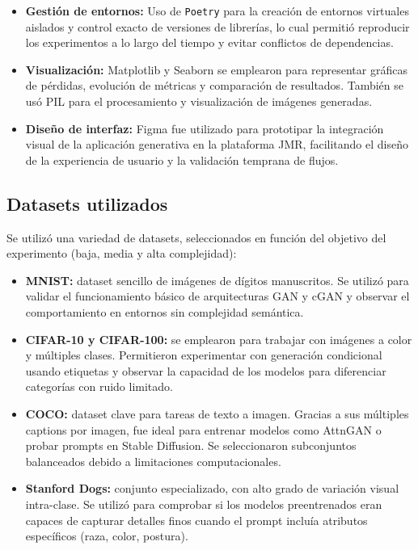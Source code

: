 \begin{itemize}
\item \textbf{Gestión de entornos:} Uso de \texttt{Poetry} para la creación de entornos virtuales aislados y control exacto de versiones de librerías, lo cual permitió reproducir los experimentos a lo largo del tiempo y evitar conflictos de dependencias.

\item \textbf{Visualización:} Matplotlib y Seaborn se emplearon para representar gráficas de pérdidas, evolución de métricas y comparación de resultados. También se usó PIL para el procesamiento y visualización de imágenes generadas.

\item \textbf{Diseño de interfaz:} Figma fue utilizado para prototipar la integración visual de la aplicación generativa en la plataforma JMR, facilitando el diseño de la experiencia de usuario y la validación temprana de flujos.


\end{itemize}

\subsection{Datasets utilizados}

Se utilizó una variedad de datasets, seleccionados en función del objetivo del experimento (baja, media y alta complejidad):

\begin{itemize}
\item \textbf{MNIST:} dataset sencillo de imágenes de dígitos manuscritos. Se utilizó para validar el funcionamiento básico de arquitecturas GAN y cGAN y observar el comportamiento en entornos sin complejidad semántica.


\item \textbf{CIFAR-10 y CIFAR-100:} se emplearon para trabajar con imágenes a color y múltiples clases. Permitieron experimentar con generación condicional usando etiquetas y observar la capacidad de los modelos para diferenciar categorías con ruido limitado.

\item \textbf{COCO:} dataset clave para tareas de texto a imagen. Gracias a sus múltiples captions por imagen, fue ideal para entrenar modelos como AttnGAN o probar prompts en Stable Diffusion. Se seleccionaron subconjuntos balanceados debido a limitaciones computacionales.

\item \textbf{Stanford Dogs:} conjunto especializado, con alto grado de variación visual intra-clase. Se utilizó para comprobar si los modelos preentrenados eran capaces de capturar detalles finos cuando el prompt incluía atributos específicos (raza, color, postura).

\end{itemize}

